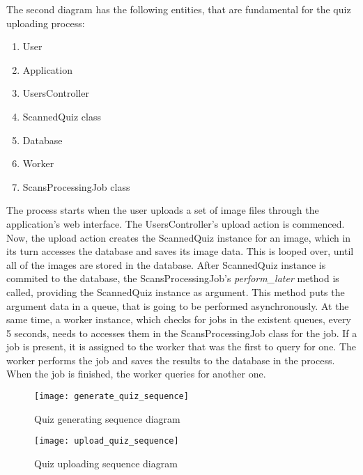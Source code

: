 The second diagram has the following entities, that are fundamental for the quiz uploading process:
\begin{enumerate}
  \item User
  \item Application
  \item UsersController
  \item ScannedQuiz class
  \item Database
  \item Worker
  \item ScansProcessingJob class
\end{enumerate}

The process starts when the user uploads a set of image files through the application's web interface. The UsersController's upload action is commenced. Now, the upload action creates the ScannedQuiz instance for an image, which in its turn accesses the database and saves its image data. This is looped over, until all of the images are stored in the database. After ScannedQuiz instance is commited to the database, the ScansProcessingJob's \textit{perform\_later} method is called, providing the ScannedQuiz instance as argument. This method puts the argument data in a queue, that is going to be performed asynchronously. At the same time, a worker instance, which checks for jobs in the existent queues, every 5 seconds, needs to accesses them in the ScansProcessingJob class for the job. If a job is present, it is assigned to the worker that was the first to query for one. The worker performs the job and saves the results to the database in the process. When the job is finished, the worker queries for another one.

\begin{sidewaysfigure}[!ht]
\centering
\texttt{[image: generate\_quiz\_sequence]}
\caption{Quiz generating sequence diagram}\label{generate_sequence}
\end{sidewaysfigure}

\begin{sidewaysfigure}[!ht]
\centering
\texttt{[image: upload\_quiz\_sequence]}
\caption{Quiz uploading sequence diagram}\label{upload_sequence}
\end{sidewaysfigure}





